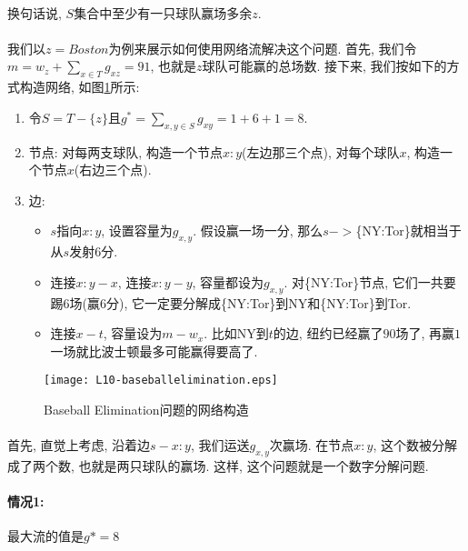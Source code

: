 \documentclass[a4paper]{article}
\renewcommand{\figurename}{图}
\begin{document}
        \paragraph{}换句话说, $S$集合中至少有一只球队赢场多余$z$.
        \paragraph{}我们以$z=Boston$为例来展示如何使用网络流解决这个问题. 首先, 我们令$m= w_z + \sum_{x\in T} g_{xz} = 91$, 也就是$z$球队可能赢的总场数. 接下来, 我们按如下的方式构造网络, 如\figurename\ref{Figure: matching_baseball_elimination_network}所示:
        \begin{enumerate}
 \item 令$S=T-\{z\}$且$g^*=\sum_{x,y\in S} g_{xy} = 1 + 6 + 1 = 8$.
 \item 节点: 对每两支球队, 构造一个节点${x:y}$(左边那三个点), 对每个球队$x$, 构造一个节点$x$(右边三个点).
 \item 边:
 	\begin{itemize}
 		\item $s$指向${x:y}$, 设置容量为$g_{x,y}$. 假设赢一场一分, 那么$s->$\{NY:Tor\}就相当于从$s$发射$6$分.
 		\item 连接$x:y-x$, 连接$x:y-y$, 容量都设为$g_{x,y}$. 对\{NY:Tor\}节点, 它们一共要踢$6$场(赢$6$分), 它一定要分解成\{NY:Tor\}到NY和\{NY:Tor\}到Tor.
 		\item 连接${x}-t$, 容量设为$m-{w_x}$. 比如NY到$t$的边, 纽约已经赢了$90$场了, 再赢$1$一场就比波士顿最多可能赢得要高了.
	\end{itemize}
        \end{enumerate}
        \begin{figure}[h]
            \centering
            \texttt{[image: L10-baseballelimination.eps]}
            \caption{{\sc Baseball Elimination}问题的网络构造}
            \label{Figure: matching_baseball_elimination_network}
        \end{figure}
        
        \paragraph{}首先, 直觉上考虑, 沿着边$s-{x:y}$, 我们运送$g_{x,y}$次赢场. 在节点$x:y$, 这个数被分解成了两个数, 也就是两只球队的赢场. 这样, 这个问题就是一个数字分解问题.
         \paragraph{情况1:}最大流的值是$g*=8$ 
\end{document}

